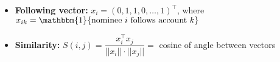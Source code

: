 \documentclass{article}
\begin{document}
	\Huge
	\begin{itemize}
		\item[] \textbf{Following vector:} $x_i = (0, 1, 1, 0, \ldots, 1)^\top$,
		where $x_{ik} = \mathbbm{1} \{\text{nominee $i$ follows account $k$}\}$
		\item[] \textbf{Similarity:} $S(i, j) = \dfrac{x_i^\top x_j} {||x_i|| \cdot ||x_j||} = $ cosine of angle between vectors
	\end{itemize}
\end{document}
